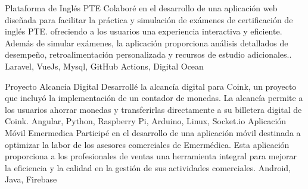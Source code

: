 %
%
%


\begin{projects}
	\project
	{Plataforma de Inglés PTE}{}
	{Colaboré en el desarrollo de una aplicación web diseñada para facilitar la práctica y simulación de exámenes de certificación de inglés PTE. ofreciendo a los usuarios una experiencia interactiva y eficiente. Además de simular exámenes, la aplicación proporciona análisis detallados de desempeño, retroalimentación personalizada y recursos de estudio adicionales..} 
	{Laravel, VueJs, Mysql, GitHub Actions, Digital Ocean}
				
	\project
	{Proyecto Alcancia Digital}{}
	{Desarrollé la alcancía digital para Coink, un proyecto que incluyó la implementación de un contador de monedas. La alcancía permite a los usuarios ahorrar monedas y transferirlas directamente a su billetera digital de Coink.}
	{	Angular, Python, Raspberry Pi, Arduino, Linux, Socket.io }
	\project
	{Aplicación Móvil Emermedica }{}
	{Participé en el desarrollo de una aplicación móvil destinada a optimizar la labor de los asesores comerciales de Emermédica. Esta aplicación proporciona a los profesionales de ventas una herramienta integral para mejorar la eficiencia y la calidad en la gestión de sus actividades comerciales.}
	{ Android, Java, Firebase }

\end{projects}